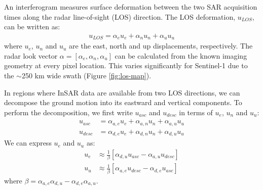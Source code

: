 An interferogram measures surface deformation between the two SAR acquisition times along the radar line-of-sight (LOS) direction. The LOS deformation, $u_{LOS}$, can be written as: 
\begin{align}
	u_{LOS}= \alpha_{e} u_{e} + \alpha_{n} u_{n} + \alpha_{u} u_{u}
\end{align}
where $u_{e}$, $u_{n}$ and $u_{u}$ are the east, north and up displacements, respectively. The radar look vector $\alpha = [\alpha_e, \alpha_n, \alpha_u]$ can be calculated from the known imaging geometry at every pixel location. This varies significantly for Sentinel-1 due to the $ \sim$250 km wide swath (Figure \ref{fig:los-map}). 




In regions where InSAR data are available from two LOS directions, we can decompose the ground motion into its eastward and vertical components.
To perform the decomposition, we first write $u_{asc}$ and $u_{desc}$ in terms of $u_e$, $u_n$ and $u_u$:
\begin{align}
	u_{asc} &= \alpha_{a,e} u_{e} + \alpha_{a,n} u_{n} + \alpha_{a,u} u_{u}\\
	u_{desc} &= \alpha_{d,e} u_{e} + \alpha_{d,n} u_{n} + \alpha_{d,u} u_{u}
\end{align}
We can express $u_e$ and $u_u$ as:
\begin{align}
	u_{e} &\approx  \frac{1}{\beta}  \left[\alpha_{d,u}  u_{asc} - \alpha_{a,u} u_{desc} \right] \\
	u_{u} &\approx  \frac{1}{\beta}  \left[\alpha_{a,e} u_{desc} - \alpha_{d,e}  u_{asc}  \right] 
\end{align}
where  $ \beta = {\alpha_{a,e} \alpha_{d,u}- \alpha_{d,e} \alpha_{a,u}} $.





